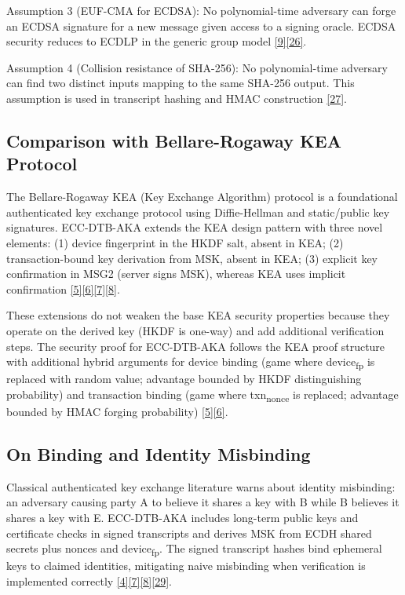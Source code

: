 \indent Assumption 3 (EUF-CMA for ECDSA): No polynomial-time adversary can forge an ECDSA signature for a new message given access to a signing oracle. ECDSA security reduces to ECDLP in the generic group model \hyperref[ref:9]{[9]}\hyperref[ref:26]{[26]}.

\indent Assumption 4 (Collision resistance of SHA-256): No polynomial-time adversary can find two distinct inputs mapping to the same SHA-256 output. This assumption is used in transcript hashing and HMAC construction \hyperref[ref:27]{[27]}.

\subsection{Comparison with Bellare-Rogaway KEA Protocol}

\indent The Bellare-Rogaway KEA (Key Exchange Algorithm) protocol is a foundational authenticated key exchange protocol using Diffie-Hellman and static/public key signatures. ECC-DTB-AKA extends the KEA design pattern with three novel elements: (1) device fingerprint in the HKDF salt, absent in KEA; (2) transaction-bound key derivation from MSK, absent in KEA; (3) explicit key confirmation in MSG2 (server signs MSK), whereas KEA uses implicit confirmation \hyperref[ref:5]{[5]}\hyperref[ref:6]{[6]}\hyperref[ref:7]{[7]}\hyperref[ref:8]{[8]}.

\indent These extensions do not weaken the base KEA security properties because they operate on the derived key (HKDF is one-way) and add additional verification steps. The security proof for ECC-DTB-AKA follows the KEA proof structure with additional hybrid arguments for device binding (game where device\textsubscript{fp} is replaced with random value; advantage bounded by HKDF distinguishing probability) and transaction binding (game where txn\textsubscript{nonce} is replaced; advantage bounded by HMAC forging probability) \hyperref[ref:5]{[5]}\hyperref[ref:6]{[6]}.

\subsection{On Binding and Identity Misbinding}

\indent Classical authenticated key exchange literature warns about identity misbinding: an adversary causing party A to believe it shares a key with B while B believes it shares a key with E. ECC-DTB-AKA includes long-term public keys and certificate checks in signed transcripts and derives MSK from ECDH shared secrets plus nonces and device\textsubscript{fp}. The signed transcript hashes bind ephemeral keys to claimed identities, mitigating naive misbinding when verification is implemented correctly \hyperref[ref:4]{[4]}\hyperref[ref:7]{[7]}\hyperref[ref:8]{[8]}\hyperref[ref:29]{[29]}.

